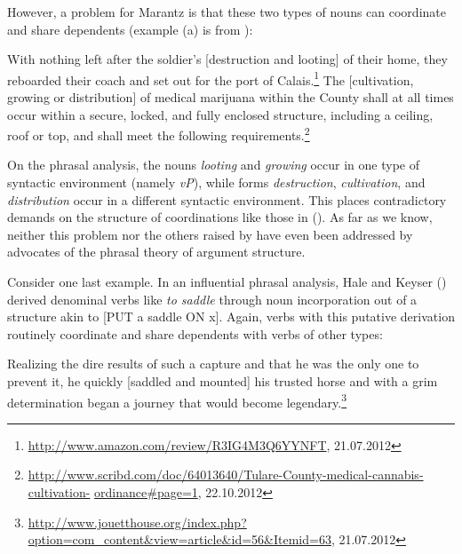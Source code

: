 However, a problem for Marantz is that these two types of nouns can coordinate and share dependents (example
(a) is from ): 

\eal
\ex With nothing left after the soldier's [destruction and looting] of their home, they reboarded
their coach and set out for the port of Calais.\footnote{\url{http://www.amazon.com/review/R3IG4M3Q6YYNFT}, 21.07.2012}
\ex  The [cultivation, growing or distribution] of medical marijuana within the County shall at all
times occur within a secure, locked, and fully enclosed structure, including a ceiling, roof or top,
and shall meet the following
requirements.\footnote{\href{http://www.scribd.com/doc/64013640/Tulare-County-medical-cannabis-cultivation-ordinance\#page=1}{http://www.scribd.com/doc/64013640/Tulare-County-medical-cannabis-cultivation-}\newline
  \href{http://www.scribd.com/doc/64013640/Tulare-County-medical-cannabis-cultivation-ordinance\#page=1}{ordinance\#page=1}, 22.10.2012}  
\zl

On the phrasal analysis, the nouns \emph{looting} and \emph{growing} occur in one type
of syntactic environment (namely \emph{vP}), while forms \emph{destruction}, \emph{cultivation}, 
 and \emph{distribution} occur in a different syntactic environment.  This places contradictory
demands on the structure of coordinations like those in ().  As far as we know, neither this problem nor
the others raised by \citet{Wechsler2008a} have even been addressed by advocates of the phrasal theory of
argument structure.    

Consider one last example.  In an influential phrasal analysis, Hale and Keyser (\citeyear{HK93a-u})
derived denominal verbs like \emph{to saddle} through noun incorporation out of a structure akin to
[PUT a saddle ON x].  Again, verbs with this putative derivation routinely coordinate and share
dependents with verbs of other types: 

\ea
Realizing the dire results of such a capture and that he was the only one to prevent it, he quickly
[saddled and mounted] his trusted horse and with a grim determination began a journey that would
become legendary.\footnote{\url{http://www.jouetthouse.org/index.php?option=com_content&view=article&id=56&Itemid=63},
  21.07.2012}  
\z

